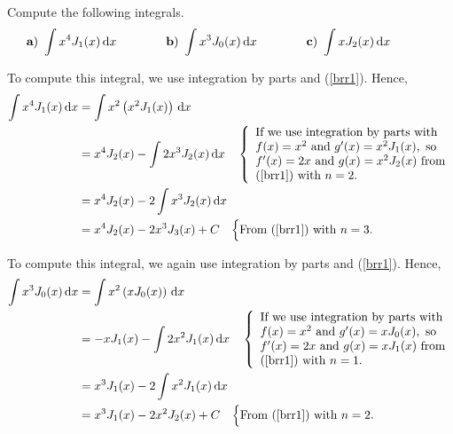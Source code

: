 \begin{egg}
Compute the following integrals.               \label{ExBesselInt}
\[
\begin{array}{*{3}{l@{\hspace{0.5em}}l@{\hspace*{4em}}}}
\text{\bfseries a}) & \displaystyle \int x^4 J_1(x) \dx{x} 
& \text{\bfseries b}) & \displaystyle \int x^3 J_0(x) \dx{x}
& \text{\bfseries c}) & \displaystyle \int x J_2(x) \dx{x}
\end{array}
\]

 To compute this integral, we use integration by parts and
(\ref{brr1}).  Hence,
\begin{align*}
\int x^4 J_1(x) \,\mathrm{d}{x}
&= \int x^2 \left( x^2 J_1(x) \right) \,\mathrm{d}{x} \\
&= x^4 J_2(x) - \int 2 x^3 J_2(x) \,\mathrm{d}{x}
\quad \left\{ 
\begin{array}{l}
\text{If we use integration by parts with} \\
f(x)=x^2 \text{ and } g'(x) = x^2 J_1(x), \text{ so} \\
f'(x) = 2x \text{ and } g(x) = x^2 J_2(x) \text{ from} \\
\text{(\ref{brr1}) with } n=2 .
\end{array} \right. \\
&= x^4 J_2(x) - 2 \int x^3 J_2(x) \,\mathrm{d}{x} \\
&= x^4 J_2(x) - 2 x^3 J_3(x) + C \quad \Big\{
\text{From (\ref{brr1}) with } n = 3 . 
\end{align*}

 To compute this integral, we again use integration by parts and
(\ref{brr1}).  Hence,
\begin{align*}
\int x^3 J_0(x) \,\mathrm{d}{x}
&= \int x^2  \left( x J_0(x)\right) \,\mathrm{d}{x} \\
&= -x J_1(x) -  \int 2 x^2 J_1(x) \,\mathrm{d}{x} \quad
\left\{
\begin{array}{l}
\text{If we use integration by parts with} \\
f(x)=x^2 \text{ and } g'(x) = x J_0(x), \text{ so} \\
f'(x) = 2x \text{ and } g(x) = x J_1(x) \text{ from} \\
\text{(\ref{brr1}) with } n=1 .
\end{array} \right. \\
&= x^3 J_1(x) - 2 \int x^2 J_1(x) \,\mathrm{d}{x} \\
&= x^3 J_1(x) - 2 x^2 J_2(x) + C \quad
\Big\{ \text{From (\ref{brr1}) with } n = 2 .
\end{align*}


\end{egg}
